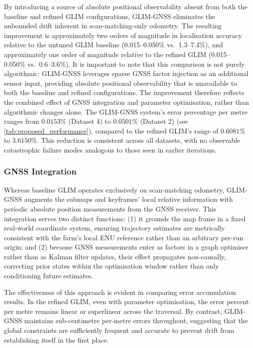 By introducing a source of absolute positional observability absent from both the baseline and refined GLIM configurations, GLIM-GNSS eliminates the unbounded drift inherent in scan-matching-only odometry. The resulting improvement is approximately two orders of magnitude in localisation accuracy relative to the untuned GLIM baseline (0.015–0.050\% vs.\ 1.3–7.4\%), and approximately one order of magnitude relative to the refined GLIM (0.015–0.050\% vs.\ 0.6–3.6\%). It is important to note that this comparison is not purely algorithmic: GLIM-GNSS leverages sparse GNSS factor injection as an additional sensor input, providing absolute positional observability that is unavailable to both the baseline and refined configurations. The improvement therefore reflects the combined effect of GNSS integration and parameter optimisation, rather than algorithmic changes alone. The GLIM-GNSS system's error percentage per metre ranges from $0.0153\%$ (Dataset 4) to $0.0501\%$ (Dataset 2) (see \cref{tab:proposed_performance}), compared to the refined GLIM's range of $0.6081\%$ to $3.6150\%$. This reduction is consistent across all datasets, with no observable catastrophic failure modes analogous to those seen in earlier iterations.

\subsubsection{GNSS Integration}

Whereas baseline GLIM operates exclusively on scan-matching odometry, GLIM-GNSS augments the submaps and keyframes' local relative information with periodic absolute position measurements from the GNSS receiver. This integration serves two distinct functions: (1) it grounds the map frame in a fixed real-world coordinate system, ensuring trajectory estimates are metrically consistent with the farm's local ENU reference rather than an arbitrary per-run origin; and (2) because GNSS measurements enter as factors in a graph optimiser rather than as Kalman filter updates, their effect propagates non-causally, correcting prior states within the optimisation window rather than only conditioning future estimates.

The effectiveness of this approach is evident in comparing error accumulation results. In the refined GLIM, even with parameter optimisation, the error percent per metre remains linear or superlinear across the traversal. By contrast, GLIM-GNSS maintains sub-centimetre per-metre errors throughout, suggesting that the global constraints are sufficiently frequent and accurate to prevent drift from establishing itself in the first place.

